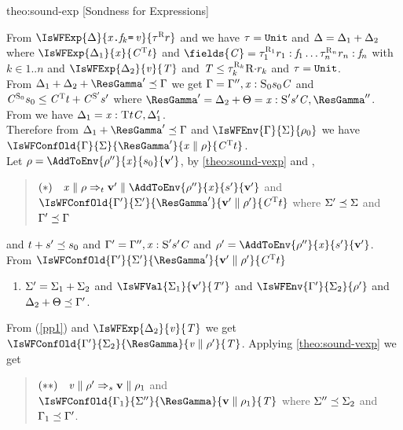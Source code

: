 \begin{proofOf}{theo:sound-exp} [Sondness for Expressions]
\begin{description}
\bpa
From $\IsWFExp{\Delta}{\FieldUpdate{\x}{\f_k}{\ve}}{\Graded{\tau}{\Rgr}{\rgr}}$ and   
we have $\tau=\texttt{Unit}$ and  $\Delta=\Delta_1+\Delta_2$ where $\IsWFExp{\Delta_1}{\x}{\Graded{\C}{\Tgr}{\tgr}}$
and  $\fields{\C}=\Field{\Graded{\tau_1}{\Rgr_1}{\rgr_1}}{\f_1} \ldots \Field{\Graded{\tau_n}{\Rgr_n}{\rgr_n}}{\f_n}$ with $k \in 1..n$ and
$\IsWFExp{\Delta_2}{\ve}{\T}$ and $\mathit{T}\leq\tau_k^{\textsc{R}_k}{\textsc{R}{\cdot}r_k}$ and $\tau=\texttt{Unit}$. \\
%
From  
$\Delta_1\ctxsum\Delta_2\ctxsum\ResGamma'\ctxord\Gamma$ we get $\Gamma=\Gamma'',\mathit{x} :\textsc{S}_0{s_0}{\mathit{C}}$ and 
$\mathit{C}^{\textsc{S}_0}{s_0}\leq\mathit{C}^{\textsc{T}}{t}+\mathit{C}^{\textsc{S}'}{s'}$
where $\ResGamma'=\Delta_2\ctxsum\Theta=\CtxElem{\x}{\Sgr'}{\sgr'}{\C},\ResGamma''$.
\\
From
  we have $\Delta_1=\mathit{x} :\textsc{T}{t}{\mathit{C}},\Delta'_1$.
\\
%
Therefore from $\Delta_1\ctxsum\ResGamma'\ctxord\Gamma$ and $\IsWFEnv{\Gamma}{\Sigma}{\env_0}$ we have
$\IsWFConfOld{\Gamma}{\Sigma}{\ResGamma'}{\VConf{\x}{\env}}{\Graded{\C}{\Tgr}{\tgr}}$. 
\\
Let $\env=\AddToEnv{\env''}{\x}{\sgr_0}{\val'}$,  by  \cref{theo:sound-vexp} and ,
 \begin{quote}
$(\ast)\quad\RedVal{\x}{\env}{\tgr}{\val'}{\AddToEnv{\env''}{\x}{\sgr'}{\val'}}$ and $\IsWFConfOld{\Gamma'}{\Sigma'}{\ResGamma'}{\VConf{\val'}{\env'}}{\Graded{\C}{\Tgr}{\tgr}}$ where
$\Sigma'\preceq\Sigma$ and $\Gamma'\preceq\Gamma$
\end{quote}
and $t+s'\preceq s_0$ and $\Gamma'=\Gamma'',\mathit{x} :\textsc{S}'{s'}{\mathit{C}}$
and $\env'=\AddToEnv{\env''}{\x}{\sgr'}{\val'}$. From $\IsWFConfOld{\Gamma'}{\Sigma'}{\ResGamma'}{\VConf{\val'}{\env'}}{\Graded{\C}{\Tgr}{\tgr}}$
\begin{enumerate}[(1)]
\item\label{pp1}  $\Sigma'=\Sigma_1+\Sigma_2$ and $\IsWFVal{\Sigma_1}{\val'}{\T'}$  and  $\IsWFEnv{\Gamma'}{\Sigma_2}{\env'}$ and 
$\Delta_2+\Theta\preceq\Gamma'$.
\end{enumerate}
From (\ref{pp1}) and $\IsWFExp{\Delta_2}{\ve}{\T}$ we get $\IsWFConfOld{\Gamma'}{\Sigma_2}{\ResGamma}{\VConf{\ve}{\env'}}{\T}$. Applying  \cref{theo:sound-vexp} we get 
 \begin{quote}
$(\ast\ast)\quad\mathit{v}\parallel\rho'\Rightarrow_{s}\mathbf{v}\parallel\rho_1$ and $\IsWFConfOld{\Gamma_1}{\Sigma''}{\ResGamma}{\VConf{\val}{\env_1}}{\T}$ where $\Sigma''\preceq\Sigma_2$ and $\Gamma_1\preceq\Gamma'$.

\end{quote}
\end{description}
\end{proofOf}

